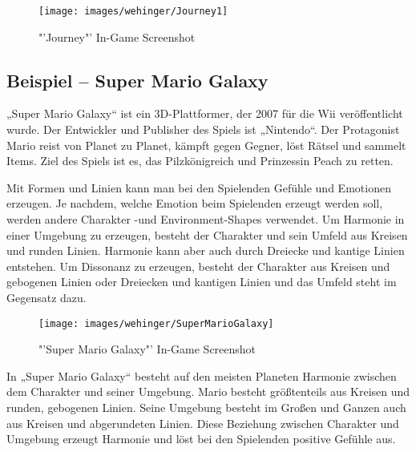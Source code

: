 \begin{figure}[H]
	\centering
	\texttt{[image: images/wehinger/Journey1]}
	\caption{"'Journey"' In-Game Screenshot \cite{_journey}}
\end{figure}

\subsection{Beispiel – Super Mario Galaxy}
„Super Mario Galaxy“ ist ein 3D-Plattformer, der 2007 für die Wii veröffentlicht wurde. Der Entwickler und Publisher des Spiels ist „Nintendo“. Der Protagonist Mario reist von Planet zu Planet, kämpft gegen Gegner, löst Rätsel und sammelt Items. Ziel des Spiels ist es, das Pilzkönigreich und Prinzessin Peach zu retten. 
\cite{_super_mario_galaxy}
\cite{_drawing_basics_and_video_game_art}

Mit Formen und Linien kann man bei den Spielenden Gefühle und Emotionen erzeugen. Je nachdem, welche Emotion beim Spielenden erzeugt werden soll, werden andere Charakter -und Environment-Shapes verwendet. Um Harmonie in einer Umgebung zu erzeugen, besteht der Charakter und sein Umfeld aus Kreisen und runden Linien. Harmonie kann aber auch durch Dreiecke und kantige Linien entstehen. Um Dissonanz zu erzeugen, besteht der Charakter aus Kreisen und gebogenen Linien oder Dreiecken und kantigen Linien und das Umfeld steht im Gegensatz dazu.
\cite{_drawing_basics_and_video_game_art}

\begin{figure}[H]
	\centering
	\texttt{[image: images/wehinger/SuperMarioGalaxy]}
	\caption{"'Super Mario Galaxy"' In-Game Screenshot\cite{_drawing_basics_and_video_game_art}}
\end{figure}

In „Super Mario Galaxy“ besteht auf den meisten Planeten Harmonie zwischen dem Charakter und seiner Umgebung. Mario besteht größtenteils aus Kreisen und runden, gebogenen Linien. Seine Umgebung besteht im Großen und Ganzen auch aus Kreisen und abgerundeten Linien. Diese Beziehung zwischen Charakter und Umgebung erzeugt Harmonie und löst bei den Spielenden positive Gefühle aus. 
\cite{_drawing_basics_and_video_game_art}



